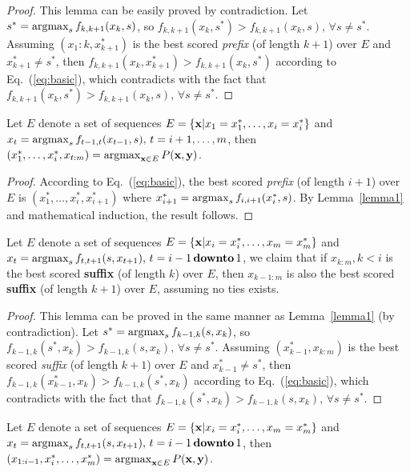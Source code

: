 \begin{proof}
This lemma can be easily proved by contradiction.
Let $s^* = \operatorname*{argmax}_{s} f_{k, k+1}(x_k, s)$, so $f_{k,k+1}(x_k, s^*) > f_{k,k+1}(x_k, s), \, \forall s \ne s^*$.
Assuming $(x_1:k, x_{k+1}^*)$ is the best scored \emph{prefix} (of length $k+1$) over $E$ and $x_{k+1}^* \ne s^*$,
then $f_{k,k+1}(x_k, x_{k+1}^*) > f_{k,k+1}(x_k, s^*)$ according to Eq.~(\ref{eq:basic}), 
which contradicts with the fact that $f_{k,k+1}(x_k, s^*) > f_{k,k+1}(x_k, s), \, \forall s \ne s^*$.
\end{proof}

\begin{theorem}
\label{theorem1}
Let $E$ denote a set of sequences $E = \{\mathbf{x} |x_1 = x_1^*, \dots, x_i = x_i^*\}$ and
$x_t = \operatorname*{argmax}_{s} f_{t-1, t}(x_{t-1}, s), \, t = i+1,\dots,m$, 
then $(x_1^*,\dots,x_i^*, x_{t:m}) = \operatorname*{argmax}_{\mathbf{x} \in E} P(\mathbf{x},\mathbf{y})$.
\end{theorem}

\begin{proof}
According to Eq.~(\ref{eq:basic}), the best scored \emph{prefix} (of length $i+1$) over $E$ is $(x_1^*,\dots,x_i^*,x_{i+1}^*)$
where $x_{i+1}^* = \operatorname*{argmax}_{s} f_{i, i+1}(x_i^*, s)$.
By Lemma~\ref{lemma1} and mathematical induction, the result follows.
\end{proof}

\begin{lemma}
\label{lemma2}
Let $E$ denote a set of sequences $E = \{\mathbf{x} |x_i = x_i^*, \dots, x_m = x_m^*\}$ and
$x_t = \operatorname*{argmax}_{s} f_{t, t+1}(s, x_{t+1}), \, t = i-1 \,\textbf{downto}\, 1$, 
we claim that if $x_{k:m}, k < i$ is the best scored \textbf{suffix} (of length $k$) over $E$, 
then $x_{k-1:m}$ is also the best scored \textbf{suffix} (of length $k+1$) over $E$,
assuming no ties exists.
\end{lemma}

\begin{proof}
This lemma can be proved in the same manner as Lemma~\ref{lemma1} (by contradiction).
Let $s^* = \operatorname*{argmax}_{s} f_{k-1, k}(s, x_k)$, so $f_{k-1,k}(s^*, x_k) > f_{k-1,k}(s, x_k), \, \forall s \ne s^*$.
Assuming $(x_{k-1}^*, x_{k:m})$ is the best scored \emph{suffix} (of length $k+1$) over $E$ and $x_{k-1}^* \ne s^*$,
then $f_{k-1,k}(x_{k-1}^*, x_k) > f_{k-1,k}(s^*, x_k)$ according to Eq.~(\ref{eq:basic}), 
which contradicts with the fact that $f_{k-1,k}(s^*, x_k) > f_{k-1,k}(s, x_k), \, \forall s \ne s^*$.
\end{proof}

\begin{theorem}
\label{theorem2}
Let $E$ denote a set of sequences $E = \{\mathbf{x} |x_i = x_i^*, \dots, x_m = x_m^*\}$ and
$x_t = \operatorname*{argmax}_{s} f_{t, t+1}(s, x_{t+1}), \, t = i-1 \,\textbf{downto}\, 1$, 
then $(x_{1:i-1},x_i^*,\dots,x_m^*) = \operatorname*{argmax}_{\mathbf{x} \in E} P(\mathbf{x},\mathbf{y})$.
\end{theorem}

